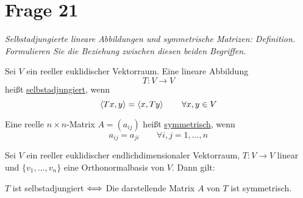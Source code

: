 \section{Frage 21}
\textit{Selbstadjungierte lineare Abbildungen und symmetrische Matrizen:
Definition. Formulieren Sie die Beziehung zwischen diesen beiden Begriffen.}
\begin{definition}
     Sei $V$ ein reeller euklidischer Vektorraum. Eine lineare Abbildung
    \[
        T: V\to V
    \] heißt \underline{selbstadjungiert}, wenn
    \[
    \left\langle Tx,y \right\rangle=\left\langle x,Ty \right\rangle\qquad \forall x,y\in V\]
\end{definition}
\begin{definition}
     Eine reelle $n\times n$-Matrix $A=(a_{ij})$ heißt \underline{symmetrisch}, wenn
    \[
    a_{ij}=a_{ji}\qquad\forall i,j=1,\dots,n
    \]
\end{definition}
\begin{theorem}
    Sei $V$ ein reeller euklidischer endlichdimensionaler Vektorraum, $T:V\to V$ linear und $\{v_1,\dots,v_n\}$
    eine Orthonormalbasis von $V$. Dann gilt:

    $T$ ist selbstadjungiert $\Longleftrightarrow$ Die darstellende Matrix $A$ von $T$ ist symmetrisch.
\end{theorem}